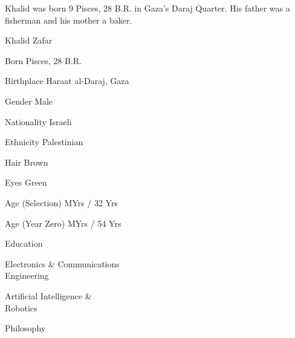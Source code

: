 

Khalid was born 9 Pisces, 28 B.R. in Gaza's Daraj Quarter. His father was a fisherman and his mother a baker.
{
    \SetupCharacterTable

    \bTABLEbody

        \bTR 
            \bTD[nc=2] \midaligned{\rotate[rotation=42]{\color[red]{\bft Todo: Character's image goes here.}}} \eTD 
        \eTR

        \bTR 
            \bTD[nc=2] Khalid Zafar \eTD 
        \eTR

        \bTR
            \bTC Born \eTC
             Pisces, 28 B.R. \eTC
        \eTR
        
        \bTR
            \bTC Birthplace \eTC
            \bTC Haraat al-Daraj, Gaza \eTC
        \eTR
        
        \bTR
            \bTC Gender \eTC
            \bTC Male \eTC
        \eTR
            
        \bTR
            \bTC Nationality \eTC
            \bTC Israeli \eTC
        \eTR
        
        \bTR
            \bTC Ethnicity \eTC
            \bTC Palestinian \eTC
        \eTR
        
        \bTR
          \bTC Hair \eTC
          \bTC Brown \eTC
        \eTR
        
        \bTR
            \bTC Eyes \eTC
            \bTC Green \eTC
        \eTR

        \bTR
            \bTC Age (Selection) \eTC %
             MYrs / 32 Yrs \eTC %
        \eTR

        \bTR
            \bTC Age (Year Zero) \eTC
             MYrs / 54 Yrs \eTC
        \eTR

        \bTR
            \bTC Education \eTC
            \bTC 
                \startitemize[4]
                \startpacked
                \item Electronics & Communications\\Engineering
                \item Artificial Intelligence &\\Robotics
                \item Philosophy 
                \stoppacked
                \stopitemize
            \eTC
        \eTR
        
}
